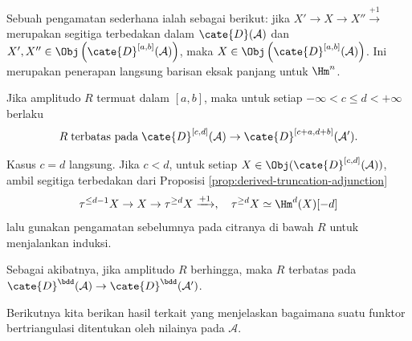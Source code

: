 Sebuah pengamatan sederhana ialah sebagai berikut: jika
$X' \to X \to X'' \xrightarrow{+1}$ merupakan segitiga terbedakan dalam
$\cate{D}(\mathcal{A})$ dan
$X', X'' \in \Obj\left(\cate{D}^{[a,b]}(\mathcal{A})\right)$, maka
$X \in \Obj\left(\cate{D}^{[a,b]}(\mathcal{A})\right)$. Ini merupakan
penerapan langsung barisan eksak panjang untuk $\Hm^n$.

\begin{lema}\label{prop:amplitude-translate}
	Jika amplitudo $R$ termuat dalam $[a,b]$, maka untuk setiap
	$-\infty < c \leq d < +\infty$ berlaku
	\[ R \; \text{terbatas pada}\; \cate{D}^{[c,d]}(\mathcal{A}) \to \cate{D}^{[c+a, d+b]}(\mathcal{A}'). \]
\end{lema}

\begin{bukti}
	Kasus $c=d$ langsung. Jika $c < d$, untuk setiap
	$X \in \Obj(\cate{D}^{[c,d]}(\mathcal{A}))$, ambil segitiga terbedakan dari
	Proposisi \ref{prop:derived-truncation-adjunction}
	\[ \tau^{\leq d-1} X \to X \to \tau^{\geq d} X \xrightarrow{+1} , \quad \tau^{\geq d} X \simeq \Hm^d(X)[-d] \]
	lalu gunakan pengamatan sebelumnya pada citranya di bawah $R$ untuk
	menjalankan induksi.
\end{bukti}

Sebagai akibatnya, jika amplitudo $R$ berhingga, maka $R$ terbatas pada
$\cate{D}^{\bdd}(\mathcal{A}) \to \cate{D}^{\bdd}(\mathcal{A}')$.

Berikutnya kita berikan hasil terkait yang menjelaskan bagaimana suatu funktor
bertriangulasi ditentukan oleh nilainya pada $\mathcal{A}$.

